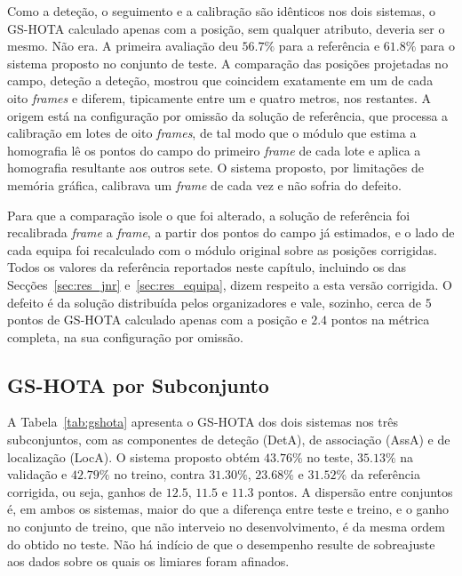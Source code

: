 Como a deteção, o seguimento e a calibração são idênticos nos dois sistemas, o GS-HOTA calculado
apenas com a posição, sem qualquer atributo, deveria ser o mesmo. Não era. A primeira avaliação
deu $56.7\%$ para a referência e $61.8\%$ para o sistema proposto no conjunto de teste. A
comparação das posições projetadas no campo, deteção a deteção, mostrou que coincidem exatamente
em um de cada oito \emph{frames} e diferem, tipicamente entre um e quatro metros, nos restantes. A
origem está na configuração por omissão da solução de referência, que processa a calibração em
lotes de oito \emph{frames}, de tal modo que o módulo que estima a homografia lê os pontos do campo do primeiro
\emph{frame} de cada lote e aplica a homografia resultante aos outros sete. O sistema proposto,
por limitações de memória gráfica, calibrava um \emph{frame} de cada vez e não sofria do defeito.

Para que a comparação isole o que foi alterado, a solução de referência foi recalibrada
\emph{frame} a \emph{frame}, a partir dos pontos do campo já estimados, e o lado de cada equipa foi
recalculado com o módulo original sobre as posições corrigidas. Todos os valores da referência
reportados neste capítulo, incluindo os das Secções~\ref{sec:res_jnr} e~\ref{sec:res_equipa}, dizem
respeito a esta versão corrigida. O defeito é da solução distribuída pelos organizadores e vale,
sozinho, cerca de $5$ pontos de GS-HOTA calculado apenas com a posição e
$2.4$ pontos na métrica completa, na sua configuração por omissão.

\subsection{GS-HOTA por Subconjunto}\label{sec:res_gshota}

A Tabela~\ref{tab:gshota} apresenta o GS-HOTA dos dois sistemas nos três subconjuntos, com as
componentes de deteção (DetA), de associação (AssA) e de localização (LocA). O sistema proposto
obtém $43.76\%$ no teste, $35.13\%$ na validação e $42.79\%$ no treino, contra
$31.30\%$, $23.68\%$ e $31.52\%$ da referência corrigida, ou seja, ganhos de
$12.5$, $11.5$ e $11.3$ pontos. A dispersão entre conjuntos é, em ambos os
sistemas, maior do que a diferença entre teste e treino, e o ganho no conjunto de treino, que não
interveio no desenvolvimento, é da mesma ordem do obtido no teste. Não há indício de que o
desempenho resulte de sobreajuste aos dados sobre os quais os limiares foram afinados.

